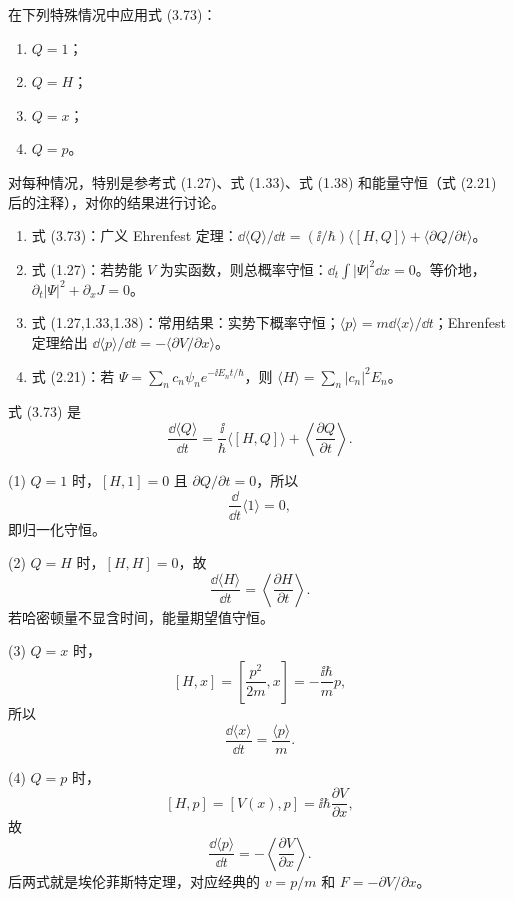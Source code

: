 \begin{question}
在下列特殊情况中应用式 (3.73)：
\begin{enumerate}
\item $Q=1$；
\item $Q=H$；
\item $Q=x$；
\item $Q=p$。
\end{enumerate}
对每种情况，特别是参考式 (1.27)、式 (1.33)、式 (1.38) 和能量守恒（式 (2.21) 后的注释），对你的结果进行讨论。

\par\smallskip
{}
\begin{enumerate}[leftmargin=2.2em,itemsep=0.12em,topsep=0.12em,parsep=0pt]
\item 式 (3.73)：广义 Ehrenfest 定理：$\dd\langle Q\rangle/\dd t=(\ii/\hbar)\langle[H,Q]\rangle+\langle\partial Q/\partial t\rangle$。
\item 式 (1.27)：若势能 $V$ 为实函数，则总概率守恒：$\dd_t\int |\Psi|^2\dd x=0$。等价地，$\partial_t|\Psi|^2+\partial_xJ=0$。
\item 式 (1.27,1.33,1.38)：常用结果：实势下概率守恒；$\langle p\rangle=m\dd\langle x\rangle/\dd t$；Ehrenfest 定理给出 $\dd\langle p\rangle/\dd t=-\langle \partial V/\partial x\rangle$。
\item 式 (2.21)：若 $\Psi=\sum_n c_n\psi_n e^{-\ii E_nt/\hbar}$，则 $\langle H\rangle=\sum_n |c_n|^2E_n$。
\end{enumerate}

\end{question}
\begin{solution}
式 (3.73) 是
\[
\frac{\dd\langle Q\rangle}{\dd t}
=\frac{\ii}{\hbar}\langle[H,Q]\rangle+\left\langle\frac{\partial Q}{\partial t}\right\rangle .
\]

(1) $Q=1$ 时，$[H,1]=0$ 且 $\partial Q/\partial t=0$，所以
\[
\frac{\dd}{\dd t}\langle 1\rangle=0,
\]
即归一化守恒。

(2) $Q=H$ 时，$[H,H]=0$，故
\[
\frac{\dd\langle H\rangle}{\dd t}=\left\langle\frac{\partial H}{\partial t}\right\rangle.
\]
若哈密顿量不显含时间，能量期望值守恒。

(3) $Q=x$ 时，
\[
[H,x]=\left[\frac{p^2}{2m},x\right]=-\frac{\ii\hbar}{m}p,
\]
所以
\[
\frac{\dd\langle x\rangle}{\dd t}=\frac{\langle p\rangle}{m}.
\]

(4) $Q=p$ 时，
\[
[H,p]=[V(x),p]=\ii\hbar\frac{\partial V}{\partial x},
\]
故
\[
\frac{\dd\langle p\rangle}{\dd t}=-\left\langle\frac{\partial V}{\partial x}\right\rangle.
\]
后两式就是埃伦菲斯特定理，对应经典的 $v=p/m$ 和 $F=-\partial V/\partial x$。
\end{solution}

